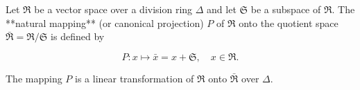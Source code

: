Let $\Re$ be a vector space over a division ring $\Delta$ and let $\mathfrak{S}$ be a subspace of $\Re$. The **natural mapping** (or canonical projection) $P$ of $\Re$ onto the quotient space $\bar{\Re} = \Re / \mathfrak{S}$ is defined by

$$P: x \mapsto \bar{x} = x + \mathfrak{S}, \quad x \in \Re.$$

The mapping $P$ is a linear transformation of $\Re$ onto $\bar{\Re}$ over $\Delta$.
